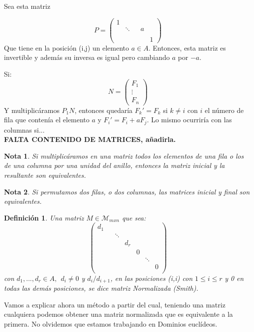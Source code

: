 \documentclass[11pt, a4paper, titlepage]{article}
\theoremstyle{theorem-style}
\theoremstyle{definition-style}
\newtheorem*{ndef}{Definición}
\theoremstyle{remark-style}
\newtheorem*{nota}{Nota}
\theoremstyle{example-style}
\begin{document}
Sea esta matriz

	\[P= \left( \begin{array}{ccccc}
 1&  &  & & \\
 &   \ddots & & a \\
 &  &  &  &  \\
 & & & & 1
 \end{array} \right)\]
Que tiene en la posición (i,j) un elemento $a\in A$. Entonces, esta matriz es invertible y además su inversa es igual pero cambiando $a$ por $-a$.

Si:
	\[ N =  \left( \begin{array}{c}
 F_1 \\
 \vdots\\
 F_n
 \end{array} \right)   \]
 Y multiplicáramos $P_1N$, entonces quedaría $F_k' = F_k $ si $k \ne i$ con $i$ el número de fila que contenía el elemento $a$ y $F_i'=F_i+aF_j$. Lo mismo ocurriría con las columnas si...\\
\textbf{FALTA CONTENIDO DE MATRICES, añadirla.}
 


\begin{nota}
	Si multiplicáramos en una matriz todos los elementos de una fila o los de una columna por una unidad del anillo, entonces la matriz inicial y la resultante son equivalentes.
\end{nota}
\begin{nota}
	Si permutamos dos filas, o dos columnas, las matrices inicial y final son equivalentes.
\end{nota}

\begin{ndef}
	Una matriz $M \in \mathcal{M}_{mxn}$ que sea:
		\[ \begin{pmatrix}
 d_{1}&  &  & & \\
 &  & \ddots &  &  \\
 & & &d_{r} &\\
 & & & & 0 \\
 & & & & & \ddots& \\
 & & & &  & & 0 \\
\end{pmatrix} \]
 con $d_1,...,d_r \in A, \ \ d_i \ne 0$ y $d_i / d_{i+1}$, en las posiciones (i,i) con $1 \leq i \leq r$ y 0 en todas las demás posiciones, se dice matriz Normalizada (Smith).
\end{ndef}

Vamos a explicar ahora un método a partir del cual, teniendo una matriz cualquiera podemos obtener una matriz normalizada que es equivalente a la primera. No olvidemos que estamos trabajando en Dominios euclídeos.
\end{document}
